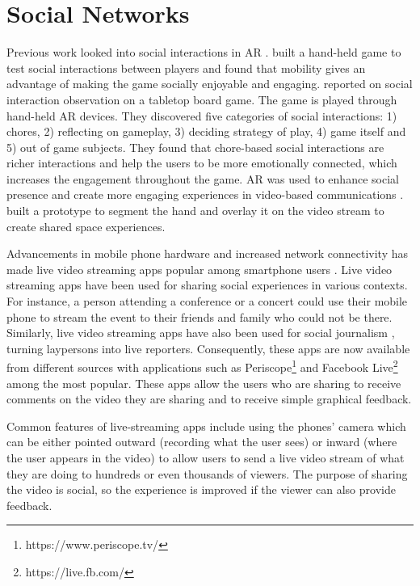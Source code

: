 \section{Social Networks}

Previous work looked into social interactions in AR \cite{Schmalstieg_144, Xu2008, Xu2011, Faas2010}. \textcite{Schmalstieg_144} built a hand-held game to test social interactions between players and found that mobility gives an advantage of making the game socially enjoyable and engaging. \textcite{Xu2011} reported on social interaction observation on a tabletop board game. The game is played through hand-held AR devices. They discovered five categories of social interactions: 1) chores, 2) reflecting on gameplay, 3) deciding strategy of play, 4) game itself and 5) out of game subjects. They found that chore-based social interactions are richer interactions and help the users to be more emotionally connected, which increases the engagement throughout the game. AR was used to enhance social presence and create more engaging experiences in video-based communications \cite{Almeida2012}. \textcite{Almeida2012} built a prototype to segment the hand and overlay it on the video stream to create shared space experiences.

Advancements in mobile phone hardware and increased network connectivity has made live video streaming apps popular among smartphone users \cite{Liu2008}. Live video streaming apps have been used for sharing social experiences in various contexts. For instance, a person attending a conference or a concert could use their mobile phone to stream the event to their friends and family who could not be there. Similarly, live video streaming apps have also been used for social journalism \cite{Lenzner2014}, turning laypersons into live reporters. Consequently, these apps are now available from different sources with applications such as Periscope\footnote{https://www.periscope.tv/} and Facebook Live\footnote{https://live.fb.com/} among the most popular. These apps allow the users who are sharing to receive comments on the video they are sharing and to receive simple graphical feedback. 

Common features of live-streaming apps include using the phones' camera which can be either pointed outward (recording what the user sees) or inward (where the user appears in the video) to allow users to send a live video stream of what they are doing to hundreds or even thousands of viewers. The purpose of sharing the video is social, so the experience is improved if the viewer can also provide feedback.

